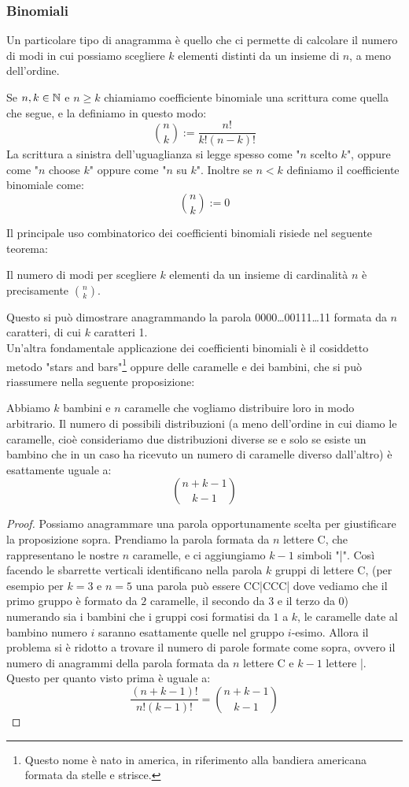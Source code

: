 \documentclass[11pt]{scrartcl}
\begin{document}
	\subsubsection{Binomiali}
	
	Un particolare tipo di anagramma è quello che ci permette di calcolare il numero di modi in cui possiamo scegliere $k$ elementi distinti da un insieme di $n$, a meno dell'ordine.
	\begin{definition}
		\label{binomial}
		Se $n,k\in\mathbb N$ e $n\ge k$ chiamiamo coefficiente binomiale una scrittura come quella che segue, e la definiamo in questo modo:
		$$\binom{n}{k}:=\frac{n!}{k!(n-k)!}$$
		La scrittura a sinistra dell'uguaglianza si legge spesso come "$n$ scelto $k$", oppure come "$n$ choose $k$" oppure come "$n$ su $k$". Inoltre se $n<k$ definiamo il coefficiente binomiale come:
		$$\binom{n}{k}:=0$$
	\end{definition}
	Il principale uso combinatorico dei coefficienti binomiali risiede nel seguente teorema:
	
	\begin{theorem}
		\label{combinazioni}
		Il numero di modi per scegliere $k$ elementi da un insieme di cardinalità $n$ è precisamente
		$\binom{n}{k}$.
	\end{theorem}
	Questo si può dimostrare anagrammando la parola 0000\dots00111\dots11 formata da $n$ caratteri, di cui $k$ caratteri 1. \\
	Un'altra fondamentale applicazione dei coefficienti binomiali è il cosiddetto metodo "stars and bars"\footnote{Questo nome è nato in america, in riferimento alla bandiera americana formata da stelle e strisce.} oppure delle caramelle e dei bambini, che si può riassumere nella seguente proposizione:
	\begin{proposition}
		Abbiamo $k$ bambini e $n$ caramelle che vogliamo distribuire loro in modo arbitrario. Il numero di possibili distribuzioni (a meno dell'ordine in cui diamo le caramelle, cioè consideriamo due distribuzioni diverse se e solo se esiste un bambino che in un caso ha ricevuto un numero di caramelle diverso dall'altro) è esattamente uguale a:
		$$\binom{n+k-1}{k-1}$$
	\end{proposition}
	\begin{proof}
		Possiamo anagrammare una parola opportunamente scelta per giustificare la proposizione sopra. Prendiamo la parola formata da $n$ lettere C, che rappresentano le nostre $n$ caramelle, e ci aggiungiamo $k-1$ simboli "|". Così facendo le sbarrette verticali identificano nella parola $k$ gruppi di lettere C, (per esempio per $k=3$ e $n=5$ una parola può essere CC|CCC| dove vediamo che il primo gruppo è formato da $2$ caramelle, il secondo da $3$ e il terzo da $0$) numerando sia i bambini che i gruppi cosi formatisi da $1$ a $k$, le caramelle date al bambino numero $i$ saranno esattamente quelle nel gruppo $i$-esimo. Allora il problema si è ridotto a trovare il numero di parole formate come sopra, ovvero il numero di anagrammi della parola formata da $n$ lettere C e $k-1$ lettere |. Questo per quanto visto prima è uguale a:
		$$\frac{(n+k-1)!}{n!(k-1)!}=\binom{n+k-1}{k-1}$$ 
	\end{proof}
	
\end{document}

